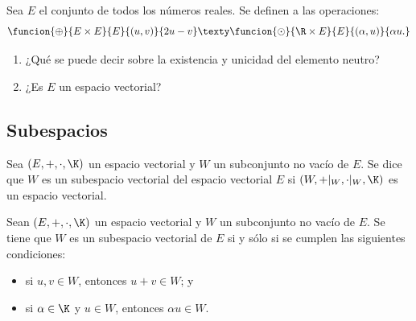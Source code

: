 \documentclass[compacto,10pt]{pubciencias-notas}
\begin{document}
\begin{ejer}\hspace{0pt} Sea $E$ el conjunto de todos los números reales. Se definen a las operaciones:
\[
    \funcion{\oplus}{E \times E}{E}{(u, v)}{2u - v}
    \texty
    \funcion{\odot}{\R \times E}{E}{(\alpha, u)}{\alpha u.}
\]
\begin{enumerate}
\item ¿Qué se puede decir sobre la existencia y unicidad del elemento neutro?
\item ¿Es $E$ un espacio vectorial?
\end{enumerate}
\end{ejer}


\subsection{Subespacios}

\begin{defi}
    Sea $(E,+,\cdot,\K)$ un espacio vectorial y $W$ un subconjunto no vacío de $E$. Se dice que $W$ es un subespacio vectorial del espacio vectorial $E$ si $(W, +|_{W}, \cdot|_{W}, \K)$ es un espacio vectorial.
\end{defi}

\begin{teo}\label{Teosev}
    Sean $(E,+,\cdot,\K)$ un espacio vectorial y $W$ un subconjunto no vacío de $E$. Se tiene que $W$ es un subespacio vectorial de $E$ si y sólo si se cumplen las siguientes condiciones:
    \vspace{-5pt}
    \begin{itemize}
    \item 
        si $u,v \in W$, entonces $u + v \in W$; y
    \item 
        si $\alpha \in \K$ y $u \in W$, entonces $\alpha u \in W$.
    \end{itemize}
\end{teo}
\end{document}
